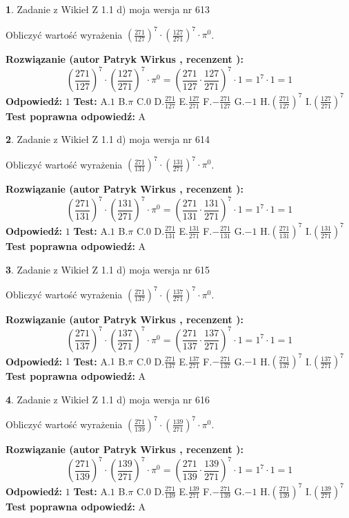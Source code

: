 \documentclass[12pt, a4paper]{article}
\theoremstyle{definition} %
\newtheorem{zad}{}
\newcommand{\zadStart}[1]{\begin{zad}#1\newline}
\newcommand{\zadStop}{\end{zad}}
\newcommand{\rozwStart}[2]{\noindent \textbf{Rozwiązanie (autor #1 , recenzent #2): }\newline}
\newcommand{\rozwStop}{\newline}
\newcommand{\odpStart}{\noindent \textbf{Odpowiedź:}\newline}
\newcommand{\odpStop}{\newline}
\newcommand{\testStart}{\noindent \textbf{Test:}\newline}
\newcommand{\testStop}{\newline}
\newcommand{\kluczStart}{\noindent \textbf{Test poprawna odpowiedź:}\newline}
\newcommand{\kluczStop}{\newline}
\begin{document}
\zadStart{Zadanie z Wikieł Z 1.1 d) moja wersja nr 613}

Obliczyć wartość wyrażenia $(\frac{271}{127})^{7} \cdot (\frac{127}{271})^{7} \cdot \pi^{0}$.
\zadStop
\rozwStart{Patryk Wirkus}{}
$$(\frac{271}{127})^{7} \cdot (\frac{127}{271})^{7} \cdot \pi^{0} = (\frac{271}{127} \cdot \frac{127}{271})^{7} \cdot 1 = 1^{7} \cdot 1 = 1$$
\rozwStop
\odpStart
$1$
\odpStop
\testStart
A.$1$ B.$\pi$ C.$0$ D.$\frac{271}{127}$ E.$\frac{127}{271}$
F.$-\frac{271}{127}$ G.$-1$
H.$(\frac{271}{127})^{7}$
I.$(\frac{127}{271})^{7}$
\testStop
\kluczStart
A
\kluczStop



\zadStart{Zadanie z Wikieł Z 1.1 d) moja wersja nr 614}

Obliczyć wartość wyrażenia $(\frac{271}{131})^{7} \cdot (\frac{131}{271})^{7} \cdot \pi^{0}$.
\zadStop
\rozwStart{Patryk Wirkus}{}
$$(\frac{271}{131})^{7} \cdot (\frac{131}{271})^{7} \cdot \pi^{0} = (\frac{271}{131} \cdot \frac{131}{271})^{7} \cdot 1 = 1^{7} \cdot 1 = 1$$
\rozwStop
\odpStart
$1$
\odpStop
\testStart
A.$1$ B.$\pi$ C.$0$ D.$\frac{271}{131}$ E.$\frac{131}{271}$
F.$-\frac{271}{131}$ G.$-1$
H.$(\frac{271}{131})^{7}$
I.$(\frac{131}{271})^{7}$
\testStop
\kluczStart
A
\kluczStop



\zadStart{Zadanie z Wikieł Z 1.1 d) moja wersja nr 615}

Obliczyć wartość wyrażenia $(\frac{271}{137})^{7} \cdot (\frac{137}{271})^{7} \cdot \pi^{0}$.
\zadStop
\rozwStart{Patryk Wirkus}{}
$$(\frac{271}{137})^{7} \cdot (\frac{137}{271})^{7} \cdot \pi^{0} = (\frac{271}{137} \cdot \frac{137}{271})^{7} \cdot 1 = 1^{7} \cdot 1 = 1$$
\rozwStop
\odpStart
$1$
\odpStop
\testStart
A.$1$ B.$\pi$ C.$0$ D.$\frac{271}{137}$ E.$\frac{137}{271}$
F.$-\frac{271}{137}$ G.$-1$
H.$(\frac{271}{137})^{7}$
I.$(\frac{137}{271})^{7}$
\testStop
\kluczStart
A
\kluczStop



\zadStart{Zadanie z Wikieł Z 1.1 d) moja wersja nr 616}

Obliczyć wartość wyrażenia $(\frac{271}{139})^{7} \cdot (\frac{139}{271})^{7} \cdot \pi^{0}$.
\zadStop
\rozwStart{Patryk Wirkus}{}
$$(\frac{271}{139})^{7} \cdot (\frac{139}{271})^{7} \cdot \pi^{0} = (\frac{271}{139} \cdot \frac{139}{271})^{7} \cdot 1 = 1^{7} \cdot 1 = 1$$
\rozwStop
\odpStart
$1$
\odpStop
\testStart
A.$1$ B.$\pi$ C.$0$ D.$\frac{271}{139}$ E.$\frac{139}{271}$
F.$-\frac{271}{139}$ G.$-1$
H.$(\frac{271}{139})^{7}$
I.$(\frac{139}{271})^{7}$
\testStop
\kluczStart
A
\kluczStop
\end{document}
